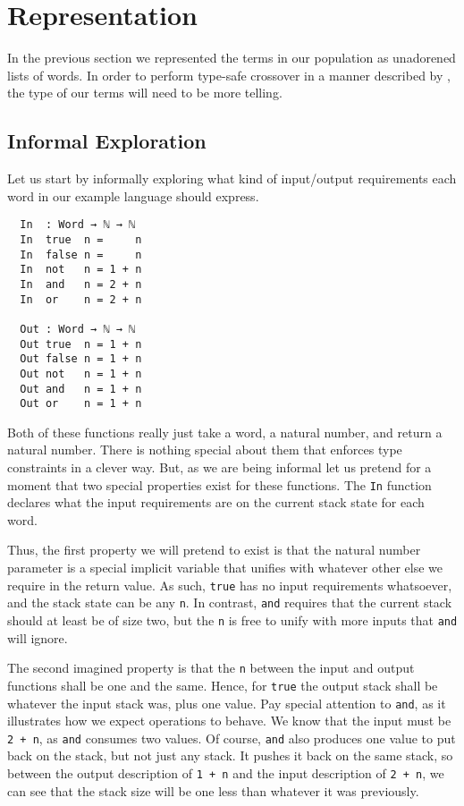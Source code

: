 \documentclass{acm_proc_article-sp}
\begin{document}
\section{Representation}

In the previous section we represented the terms in our population as
unadorened lists of words. In order to perform type-safe crossover in
a manner described by \cite{tchernev:forthcross}, the type of our
terms will need to be more telling.

\subsection{Informal Exploration}

Let us start by informally exploring what kind of input/output
requirements each word in our example language should express. 

\begin{verbatim}
  In  : Word → ℕ → ℕ
  In  true  n =     n
  In  false n =     n
  In  not   n = 1 + n
  In  and   n = 2 + n
  In  or    n = 2 + n

  Out : Word → ℕ → ℕ
  Out true  n = 1 + n
  Out false n = 1 + n
  Out not   n = 1 + n
  Out and   n = 1 + n
  Out or    n = 1 + n
\end{verbatim}

Both of these functions really just take a word, a natural number, and
return a natural number. There is nothing special about them that
enforces type constraints in a clever way. But, as we are being
informal let us pretend for a moment that two special properties exist
for these functions. The \texttt{In} function declares what the input
requirements are on the current stack state for each word.

Thus, the first property we will pretend to exist is that the natural number
parameter is a special implicit variable that unifies with whatever
other else we require in the return value. As such, \texttt{true} has
no input requirements whatsoever, and the stack state can be any
\texttt{n}. In contrast, \texttt{and} requires that the current stack
should at least be of size two, but the \texttt{n} is free to unify
with more inputs that \texttt{and} will ignore.

The second imagined property is that the \texttt{n} between the input
and output functions shall be one and the same. Hence, for
\texttt{true} the output stack shall be whatever the input stack was,
plus one value. Pay special attention to \texttt{and}, as it
illustrates how we expect operations to behave. We know that the input
must be \texttt{2 + n}, as \texttt{and} consumes two values. Of
course, \texttt{and} also produces one value to put back on the
stack, but not just any stack. It pushes it back on the same stack, so
between the output description of \texttt{1 + n} and the input
description of \texttt{2 + n}, we can see that the stack size will be
one less than whatever it was previously.
\end{document}
